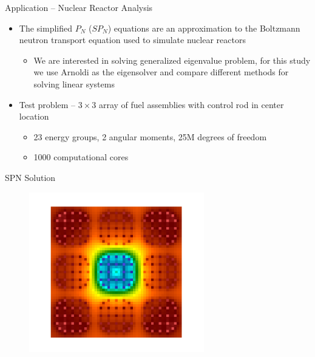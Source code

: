 \documentclass{beamer}
\begin{document}
\begin{frame}{Application -- Nuclear Reactor Analysis}
  \begin{itemize}
    \item The simplified $P_N$ ($SP_N$) equations are an approximation
      to the Boltzmann neutron transport equation used to simulate nuclear
      reactors
      \begin{itemize}
        \item We are interested in solving generalized eigenvalue problem,
          for this study we use Arnoldi as the eigensolver and compare
          different methods for solving linear systems
      \end{itemize}
    \vfill
    \item Test problem -- $3 \times 3$ array of fuel assemblies with
      control rod in center location
      \begin{itemize}
        \item 23 energy groups, 2 angular moments, 25M degrees of freedom
        \item 1000 computational cores
      \end{itemize}
  \end{itemize}
\end{frame}
\begin{frame}{SPN Solution}
  \begin{figure}
    \centering
    \includegraphics[width=3in]{prob4}
  \end{figure}
\end{frame}
\end{document}
